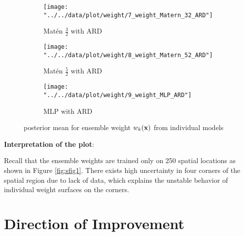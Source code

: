 \documentclass[11pt]{article}
\theoremstyle{definition}
\begin{document}
\begin{figure}[ht]
\begin{subfigure}{.33\textwidth}
  \centering
  \texttt{[image: "../../data/plot/weight/7\_weight\_Matern\_32\_ARD"]}
  \caption{Mat\'{e}n $\frac{3}{2}$ with ARD}
  \label{fig:sfig21}
\end{subfigure}\hspace*{-0.1em}
\begin{subfigure}{.33\textwidth}
  \centering
  \texttt{[image: "../../data/plot/weight/8\_weight\_Matern\_52\_ARD"]}
  \caption{Mat\'{e}n $\frac{5}{2}$ with ARD}
  \label{fig:sfig22}
\end{subfigure}\hspace*{-0.1em}
\begin{subfigure}{.33\textwidth}
  \centering
  \texttt{[image: "../../data/plot/weight/9\_weight\_MLP\_ARD"]}
  \caption{MLP with ARD}
  \label{fig:sfig23}
\end{subfigure}
\caption{posterior mean for ensemble weight $w_k({\bf x})$ from individual models}
\label{fig:ens_weight}
\end{figure}

\textbf{Interpretation of the plot}: 

Recall that the ensemble weights are trained only on 250 spatial locations as shown in Figure \ref{fig:sfig1}. There exists high uncertainty in four corners of the spatial region due to lack of data, which explains the unstable behavior of individual weight surfaces on the corners.




\clearpage
\section{\textbf{Direction of Improvement}}
\end{document}
